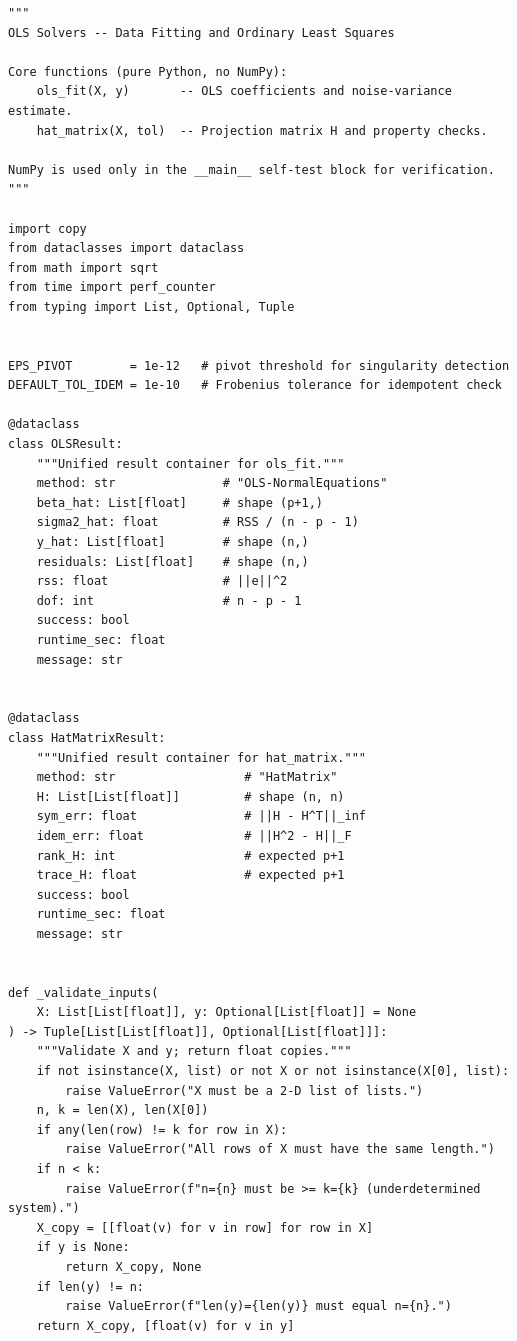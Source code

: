 \begin{lstlisting}[caption={Imports, hang so, dataclass va cac ham phu tro}, label={lst:primitives}]
"""
OLS Solvers -- Data Fitting and Ordinary Least Squares

Core functions (pure Python, no NumPy):
    ols_fit(X, y)       -- OLS coefficients and noise-variance estimate.
    hat_matrix(X, tol)  -- Projection matrix H and property checks.

NumPy is used only in the __main__ self-test block for verification.
"""

import copy
from dataclasses import dataclass
from math import sqrt
from time import perf_counter
from typing import List, Optional, Tuple


EPS_PIVOT        = 1e-12   # pivot threshold for singularity detection
DEFAULT_TOL_IDEM = 1e-10   # Frobenius tolerance for idempotent check

@dataclass
class OLSResult:
    """Unified result container for ols_fit."""
    method: str               # "OLS-NormalEquations"
    beta_hat: List[float]     # shape (p+1,)
    sigma2_hat: float         # RSS / (n - p - 1)
    y_hat: List[float]        # shape (n,)
    residuals: List[float]    # shape (n,)
    rss: float                # ||e||^2
    dof: int                  # n - p - 1
    success: bool
    runtime_sec: float
    message: str


@dataclass
class HatMatrixResult:
    """Unified result container for hat_matrix."""
    method: str                  # "HatMatrix"
    H: List[List[float]]         # shape (n, n)
    sym_err: float               # ||H - H^T||_inf
    idem_err: float              # ||H^2 - H||_F
    rank_H: int                  # expected p+1
    trace_H: float               # expected p+1
    success: bool
    runtime_sec: float
    message: str


def _validate_inputs(
    X: List[List[float]], y: Optional[List[float]] = None
) -> Tuple[List[List[float]], Optional[List[float]]]:
    """Validate X and y; return float copies."""
    if not isinstance(X, list) or not X or not isinstance(X[0], list):
        raise ValueError("X must be a 2-D list of lists.")
    n, k = len(X), len(X[0])
    if any(len(row) != k for row in X):
        raise ValueError("All rows of X must have the same length.")
    if n < k:
        raise ValueError(f"n={n} must be >= k={k} (underdetermined system).")
    X_copy = [[float(v) for v in row] for row in X]
    if y is None:
        return X_copy, None
    if len(y) != n:
        raise ValueError(f"len(y)={len(y)} must equal n={n}.")
    return X_copy, [float(v) for v in y]



\end{lstlisting}
